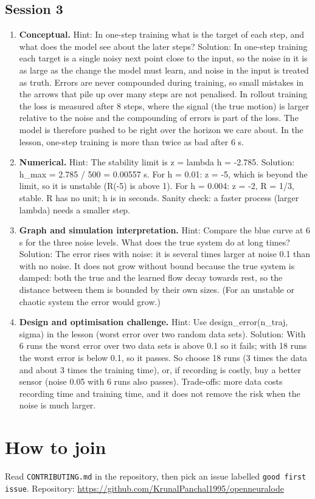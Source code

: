 \documentclass[11pt,a4paper]{article}
\begin{document}
\subsection*{Session 3}
\begin{enumerate}[nosep]
\item \textbf{Conceptual.} Hint: In one-step training what is the target of each step, and what does the model see about the later steps? Solution: In one-step training each target is a single noisy next point close to the input, so the noise in it is as large as the change the model must learn, and noise in the input is treated as truth. Errors are never compounded during training, so small mistakes in the arrows that pile up over many steps are not penalised. In rollout training the loss is measured after 8 steps, where the signal (the true motion) is larger relative to the noise and the compounding of errors is part of the loss. The model is therefore pushed to be right over the horizon we care about. In the lesson, one-step training is more than twice as bad after 6 s.
\item \textbf{Numerical.} Hint: The stability limit is z = lambda h = -2.785. Solution: h\_max = 2.785 / 500 = 0.00557 s. For h = 0.01: z = -5, which is beyond the limit, so it is unstable (\textbar{}R(-5)\textbar{} is above 1). For h = 0.004: z = -2, R = 1/3, stable. R has no unit; h is in seconds. Sanity check: a faster process (larger \textbar{}lambda\textbar{}) needs a smaller step.
\item \textbf{Graph and simulation interpretation.} Hint: Compare the blue curve at 6 s for the three noise levels. What does the true system do at long times? Solution: The error rises with noise: it is several times larger at noise 0.1 than with no noise. It does not grow without bound because the true system is damped: both the true and the learned flow decay towards rest, so the distance between them is bounded by their own sizes. (For an unstable or chaotic system the error would grow.)
\item \textbf{Design and optimisation challenge.} Hint: Use design\_error(n\_traj, sigma) in the lesson (worst error over two random data sets). Solution: With 6 runs the worst error over two data sets is above 0.1 so it fails; with 18 runs the worst error is below 0.1, so it passes. So choose 18 runs (3 times the data and about 3 times the training time), or, if recording is costly, buy a better sensor (noise 0.05 with 6 runs also passes). Trade-offs: more data costs recording time and training time, and it does not remove the risk when the noise is much larger.
\end{enumerate}

\section{How to join}
Read \texttt{CONTRIBUTING.md} in the repository, then pick an issue labelled \texttt{good first issue}. Repository: \url{https://github.com/KrunalPanchal1995/openneuralode}
\end{document}
